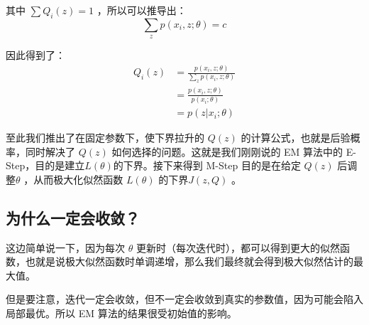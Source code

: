 \documentclass[12pt]{article}
\begin{document}
其中 $\sum{Q_i(z)} = 1$ ，所以可以推导出：
$$
\sum_z{p(x_i, z;\theta)} = c
$$

因此得到了：
\begin{align*}
Q_i(z) &= \frac{p(x_i, z;\theta)}{\sum_zp(x_i, z;\theta)} \\
	&= \frac{p(x_i, z;\theta)}{p(x_i;\theta)} \\
	&= p(z|x_i;\theta)
\end{align*}

至此我们推出了在固定参数下，使下界拉升的 $Q(z)$ 的计算公式，也就是后验概率，同时解决了 $Q(z)$ 如何选择的问题。这就是我们刚刚说的 EM 算法中的 E-Step，目的是建立$L(\theta)$的下界。接下来得到 M-Step 目的是在给定 $Q(z)$ 后调整$\theta$ ，从而极大化似然函数 $L(\theta)$ 的下界$J(z,Q)$ 。

\subsection{为什么一定会收敛？}
这边简单说一下，因为每次 $\theta$ 更新时（每次迭代时），都可以得到更大的似然函数，也就是说极大似然函数时单调递增，那么我们最终就会得到极大似然估计的最大值。

但是要注意，迭代一定会收敛，但不一定会收敛到真实的参数值，因为可能会陷入局部最优。所以 EM 算法的结果很受初始值的影响。



\end{document}
